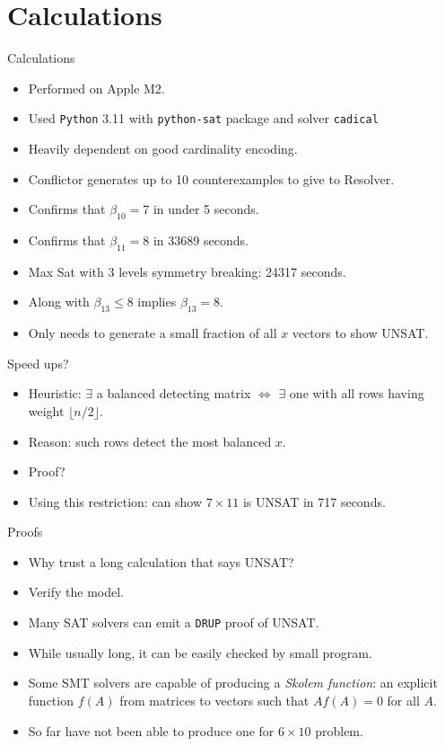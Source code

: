 
\section{Calculations}
\label{sec:calc}

\begin{frame}{Calculations}
  \begin{itemize}
  \item Performed on Apple M2.
  \item Used {\tt Python} 3.11 with {\tt python-sat} package and
    solver {\tt cadical}
  \item Heavily dependent on good cardinality encoding.
  \item Conflictor generates up to 10 counterexamples to give to
    Resolver.
  \item Confirms that $\beta_{10} = 7$ in under 5 seconds.
  \item Confirms that $\beta_{11} = 8$ in 33689 seconds.
  \item Max Sat with 3 levels symmetry breaking: 24317 seconds.
  \item Along with $\beta_{13} \le 8$ implies $\beta_{13} = 8$.
  \item Only needs to generate a small fraction of all $x$ vectors to
    show UNSAT.
  \end{itemize}
\end{frame}
\begin{frame}{Speed ups?}
  \begin{itemize}
  \item Heuristic: $\exists$ a balanced detecting matrix
    $\Leftrightarrow$ $\exists$
    one with all rows having weight $\lfloor n/2 \rfloor$.
  \item Reason: such rows detect the most balanced $x$.
  \item Proof?
  \item Using this restriction: can show $7 \times 11$ is UNSAT in 717
    seconds.
  \end{itemize}
\end{frame}
\begin{frame}{Proofs}
  \begin{itemize}
  \item Why trust a long calculation that says UNSAT?
  \item Verify the model.
  \item Many SAT solvers can emit a {\tt DRUP} proof of UNSAT.
  \item While usually long, it can be easily checked by small program.
  \item Some SMT solvers are capable of producing a \emph{Skolem
      function}: an explicit function $f(A)$ from matrices to vectors
    such that $A f(A) = 0$ for all $A$.
  \item So far have not been able to produce one for $6 \times 10$
    problem.
  \end{itemize}
\end{frame}
